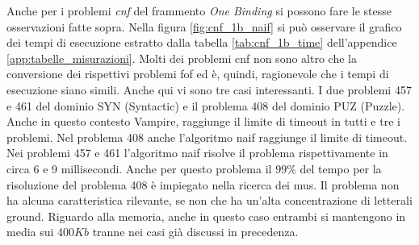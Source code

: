 \documentclass[./main.tex]{subfiles}
\begin{document}


Anche per i problemi \textit{cnf} del frammento \textit{One Binding} si possono fare le stesse osservazioni fatte sopra.
Nella figura \ref{fig:cnf_1b_naif} si può osservare il grafico dei tempi di esecuzione estratto dalla tabella \ref{tab:cnf_1b_time} dell'appendice \ref{app:tabelle_misurazioni}.
Molti dei problemi cnf non sono altro che la conversione dei rispettivi problemi fof ed è, quindi, ragionevole
che i tempi di esecuzione siano simili.
Anche qui vi sono tre casi interessanti. 
I due problemi 457 e 461 del dominio SYN (Syntactic) e il problema 408 del dominio PUZ (Puzzle). 
Anche in questo contesto Vampire, raggiunge il limite di timeout in tutti e tre i problemi.
Nel problema 408 anche l'algoritmo naif raggiunge il limite di timeout.
Nei problemi 457 e 461 l'algoritmo naif risolve il problema rispettivamente in circa 6 e 9 millisecondi.
Anche per questo problema il $99\%$ del tempo per la risoluzione del problema 408 è impiegato nella ricerca dei mus.
Il problema non ha alcuna caratteristica rilevante, se non che ha un'alta concentrazione di letterali ground.
Riguardo alla memoria, anche in questo caso entrambi si mantengono in media sui $400Kb$ tranne nei casi già discussi in precedenza.



\end{document}
